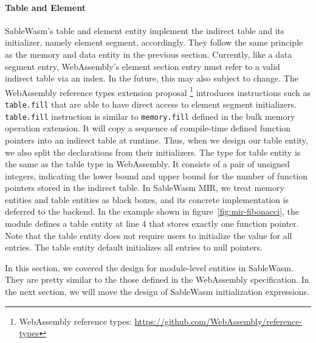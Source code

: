 \paragraph{Table and Element}
SableWasm's table and element entity implement the indirect table and its
initializer, namely element segment, accordingly. They follow the same principle
as the memory and data entity in the previous section. Currently, like a data
segment entry, WebAssembly's element section entry must refer to a valid
indirect table via an index. In the future, this may also subject to change. The
WebAssembly reference types extension proposal \footnote{WebAssembly reference
  types: \url{https://github.com/WebAssembly/reference-types}} introduces
instructions such as \texttt{table.fill} that are able to have direct access to
element segment initializers. \texttt{table.fill} instruction is similar to
\texttt{memory.fill} defined in the bulk memory operation extension. It will
copy a sequence of compile-time defined function pointers into an indirect table
at runtime. Thus, when we design our table entity, we also split the
declarations from their initializers. The type for table entity is the same as
the table type in WebAssembly. It consists of a pair of unsigned integers,
indicating the lower bound and upper bound for the number of function pointers
stored in the indirect table. In SableWasm MIR, we treat memory entities and
table entities as black boxes, and its concrete implementation is deferred to
the backend. In the example shown in figure~\ref{fig:mir-fibonacci}, the module
defines a table entity at line 4 that stores exactly one function pointer. Note
that the table entity does not require users to initialize the value for all
entries. The table entity default initializes all entries to null pointers.

In this section, we covered the design for module-level entities in SableWasm.
They are pretty similar to the those defined in the WebAssembly specification.
In the next section, we will move the design of SableWasm initialization
expressions.